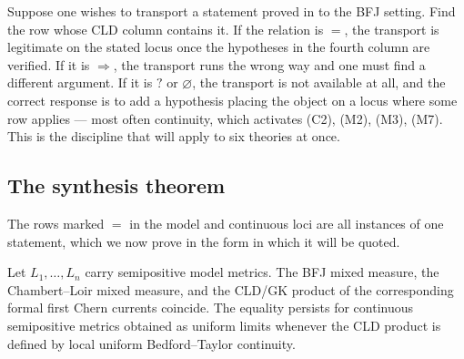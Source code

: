 \begin{remark}
\label{rem:ch31-how-to-use}
Suppose one wishes to transport a statement proved in  to the
BFJ setting.  Find the row whose CLD column contains it.  If the relation is
\(=\), the transport is legitimate on the stated locus once the hypotheses
in the fourth column are verified.  If it is \(\Rightarrow\), the transport
runs the wrong way and one must find a different argument.  If it is
\(?\) or \(\varnothing\), the transport is not available at all, and the
correct response is to add a hypothesis placing the object on a locus where
some row applies --- most often continuity, which activates (C2), (M2),
(M3), (M7).  This is the discipline that  will
apply to six theories at once.
\end{remark}

\subsection{The synthesis theorem}
\label{sec:ch31-synthesis-theorem}

The rows marked \(=\) in the model and continuous loci are all instances of
one statement, which we now prove in the form in which it will be quoted.

\begin{theorem}
\label{thm:bfj-cld-common-locus-synthesis}
Let \(L_1,\ldots,L_n\) carry semipositive model metrics.  The BFJ mixed
measure, the Chambert--Loir mixed measure, and the CLD/GK product of the
corresponding formal first Chern currents coincide.  The equality persists
for continuous semipositive metrics obtained as uniform limits whenever the
CLD product is defined by local uniform Bedford--Taylor continuity.
\end{theorem}

